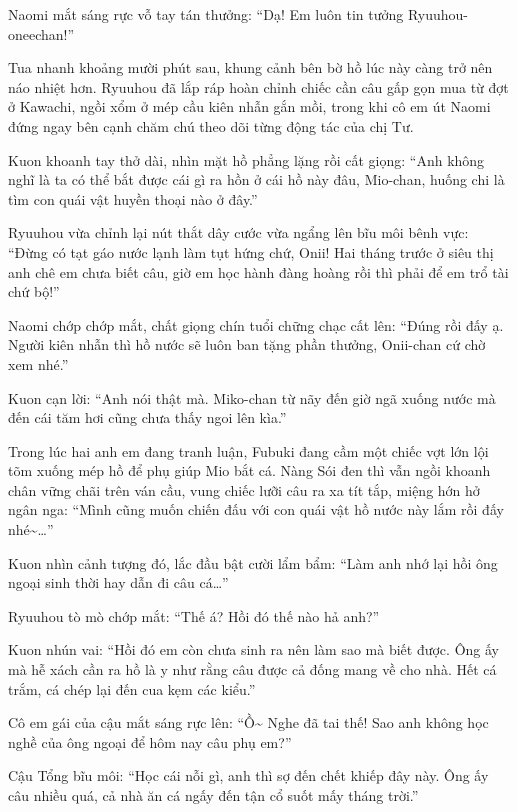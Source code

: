 \documentclass[../main.tex]{subfiles}
\begin{document}
Naomi mắt sáng rực vỗ tay tán thưởng: ``Dạ! Em luôn tin tưởng Ryuuhou-oneechan!''

\ct

Tua nhanh khoảng mười phút sau, khung cảnh bên bờ hồ lúc này càng trở nên náo nhiệt hơn. Ryuuhou đã lắp ráp hoàn chỉnh chiếc cần câu gấp gọn mua từ đợt ở Kawachi, ngồi xổm ở mép cầu kiên nhẫn gắn mồi, trong khi cô em út Naomi đứng ngay bên cạnh chăm chú theo dõi từng động tác của chị Tư.

Kuon khoanh tay thở dài, nhìn mặt hồ phẳng lặng rồi cất giọng: ``Anh không nghĩ là ta có thể bắt được cái gì ra hồn ở cái hồ này đâu, Mio-chan, huống chi là tìm con quái vật huyền thoại nào ở đây.''

Ryuuhou vừa chỉnh lại nút thắt dây cước vừa ngẩng lên bĩu môi bênh vực: ``Đừng có tạt gáo nước lạnh làm tụt hứng chứ, Onii! Hai tháng trước ở siêu thị anh chê em chưa biết câu, giờ em học hành đàng hoàng rồi thì phải để em trổ tài chứ bộ!''

Naomi chớp chớp mắt, chất giọng chín tuổi chững chạc cất lên: ``Đúng rồi đấy ạ. Người kiên nhẫn thì hồ nước sẽ luôn ban tặng phần thưởng, Onii-chan cứ chờ xem nhé.''

Kuon cạn lời: ``Anh nói thật mà. Miko-chan từ nãy đến giờ ngã xuống nước mà đến cái tăm hơi cũng chưa thấy ngoi lên kìa.''

Trong lúc hai anh em đang tranh luận, Fubuki đang cầm một chiếc vợt lớn lội tõm xuống mép hồ để phụ giúp Mio bắt cá. Nàng Sói đen thì vẫn ngồi khoanh chân vững chãi trên ván cầu, vung chiếc lưỡi câu ra xa tít tắp, miệng hớn hở ngân nga: ``Mình cũng muốn chiến đấu với con quái vật hồ nước này lắm rồi đấy nhé\~{}\dots''


Kuon nhìn cảnh tượng đó, lắc đầu bật cười lẩm bẩm: ``Làm anh nhớ lại hồi ông ngoại sinh thời hay dẫn đi câu cá\dots''

Ryuuhou tò mò chớp mắt: ``Thế á? Hồi đó thế nào hả anh?''

Kuon nhún vai: ``Hồi đó em còn chưa sinh ra nên làm sao mà biết được. Ông ấy mà hễ xách cần ra hồ là y như rằng câu được cả đống mang về cho nhà. Hết cá trắm, cá chép lại đến cua kẹm các kiểu.''

Cô em gái của cậu mắt sáng rực lên: ``Ồ\~{} Nghe đã tai thế! Sao anh không học nghề của ông ngoại để hôm nay câu phụ em?''

Cậu Tổng bĩu môi: ``Học cái nỗi gì, anh thì sợ đến chết khiếp đây này. Ông ấy câu nhiều quá, cả nhà ăn cá ngấy đến tận cổ suốt mấy tháng trời.''
\end{document}
